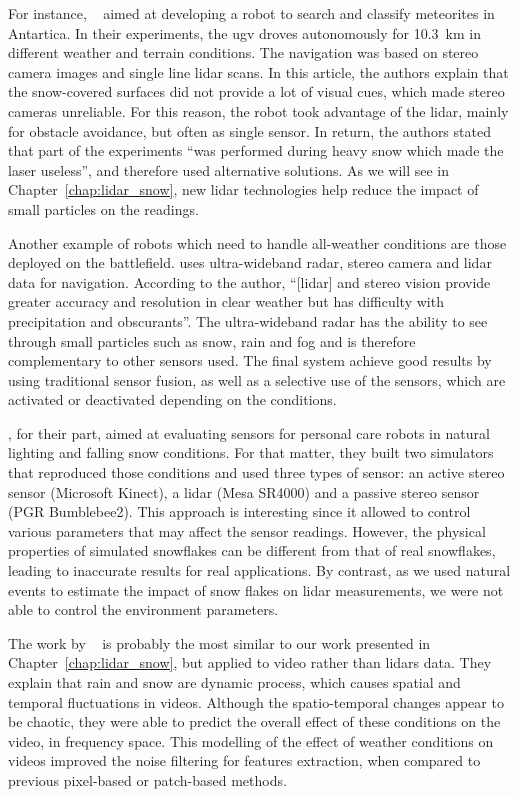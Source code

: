 For instance, ~\citet{Moorehead_1999_2122} aimed at developing a robot to search and classify meteorites in Antartica. In their experiments, the \gls*{ugv} droves autonomously for \SI{10.3}{\kilo\meter} in different weather and terrain conditions. The navigation was based on stereo camera images and single line \gls*{lidar} scans. In this article, the authors explain that the snow-covered surfaces did not provide a lot of visual cues, which made stereo cameras unreliable. For this reason, the robot took advantage of the \gls*{lidar}, mainly for obstacle avoidance, but often as single sensor. In return, the authors stated that part of the experiments \enquote{was performed during heavy snow which made the laser useless}, and therefore used alternative solutions. As we will see in Chapter~\ref{chap:lidar_snow}, new \gls*{lidar} technologies help reduce the impact of small particles on the readings. 

Another example of robots which need to handle all-weather conditions are those deployed on the battlefield. \citet{yamauchi2010fusing} uses ultra-wideband radar, stereo camera and \gls*{lidar} data for navigation. According to the author, \enquote{[\gls*{lidar}] and stereo vision provide greater accuracy and resolution in clear weather but has difficulty with precipitation and obscurants}. The ultra-wideband radar has the ability to see through small particles such as snow, rain and fog and is therefore complementary to other sensors used. The final system achieve good results by using traditional sensor fusion, as well as a selective use of the sensors, which are activated or deactivated depending on the conditions. 

\citet{sumi-arso-13}, for their part, aimed at evaluating sensors for personal care robots in natural lighting and falling snow conditions. For that matter, they built two simulators that reproduced those conditions and used three types of sensor: an active stereo sensor (Microsoft Kinect), a \gls*{lidar} (Mesa SR4000) and a passive stereo sensor (PGR Bumblebee2). This approach is interesting since it allowed to control various parameters that may affect the sensor readings. However, the physical properties of simulated snowflakes can be different from that of real snowflakes, leading to inaccurate results for real applications. By contrast, as we used natural events to estimate the impact of snow flakes on \gls*{lidar} measurements, we were not able to control the environment parameters.

The work by ~\citet{barnum2010analysis} is probably the most similar to our work presented in Chapter~\ref{chap:lidar_snow}, but applied to video rather than \gls*{lidar}s data. They explain that rain and snow are dynamic process, which causes spatial and temporal fluctuations in videos. Although the spatio-temporal changes appear to be chaotic, they were able to predict the overall effect of these conditions on the video, in frequency space. This modelling of the effect of weather conditions on videos improved the noise filtering for features extraction, when compared to previous pixel-based or patch-based methods.

